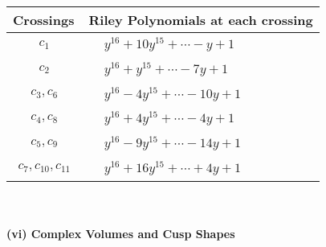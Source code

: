 \documentclass[1p]{elsarticle_modified}
\theoremstyle{definition}
\begin{document}
\begin{tabular}{m{50pt}|m{274pt}}
Crossings & \hspace{64pt}Riley Polynomials at each crossing \\
\hline $$\begin{aligned}c_{1}\end{aligned}$$&$\begin{aligned}
&y^{16}+10 y^{15}+\cdots- y+1
\end{aligned}$\\
\hline $$\begin{aligned}c_{2}\end{aligned}$$&$\begin{aligned}
&y^{16}+y^{15}+\cdots-7 y+1
\end{aligned}$\\
\hline $$\begin{aligned}c_{3},c_{6}\end{aligned}$$&$\begin{aligned}
&y^{16}-4 y^{15}+\cdots-10 y+1
\end{aligned}$\\
\hline $$\begin{aligned}c_{4},c_{8}\end{aligned}$$&$\begin{aligned}
&y^{16}+4 y^{15}+\cdots-4 y+1
\end{aligned}$\\
\hline $$\begin{aligned}c_{5},c_{9}\end{aligned}$$&$\begin{aligned}
&y^{16}-9 y^{15}+\cdots-14 y+1
\end{aligned}$\\
\hline $$\begin{aligned}c_{7},c_{10},c_{11}\end{aligned}$$&$\begin{aligned}
&y^{16}+16 y^{15}+\cdots+4 y+1
\end{aligned}$\\
\hline
\end{tabular}\\~\\
\newpage\flushleft \textbf{(vi) Complex Volumes and Cusp Shapes}
\end{document}
